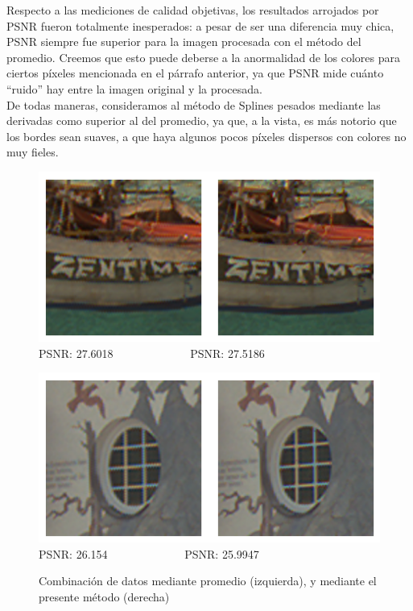 \documentclass[a4paper]{article}
\begin{document}
Respecto a las mediciones de calidad objetivas, los resultados arrojados por PSNR fueron totalmente inesperados: a pesar de ser una diferencia muy chica, PSNR siempre fue superior para la imagen procesada con el método del promedio. Creemos que esto puede deberse a la anormalidad de los colores para ciertos píxeles mencionada en el párrafo anterior, ya que PSNR mide cuánto ``ruido'' hay entre la imagen original y la procesada. \\

De todas maneras, consideramos al método de Splines pesados mediante las derivadas como superior al del promedio, ya que, a la vista, es más notorio que los bordes sean suaves, a que haya algunos pocos píxeles dispersos con colores no muy fieles. \\

\begin{figure}[h!]
	\begin{center}
	    \includegraphics[scale=0.47]{imagenes/Splines/RecortesSplines/pesos1y0/barco2.png}\\
	    PSNR: 27.6018 \ \ \ \ \ \ \ \ \ \ \ \ \ PSNR: 27.5186
	\end{center}
	\begin{center}
	    \includegraphics[scale=0.47]{imagenes/Splines/RecortesSplines/pesos1y0/ventana.png}\\
	    PSNR: 26.154 \ \ \ \ \ \ \ \ \ \ \ \ \ PSNR: 25.9947
	\end{center}
	\caption{Combinación de datos mediante promedio (izquierda), y mediante el presente método (derecha)}
	\label{splines3}
\end{figure}
\end{document}
